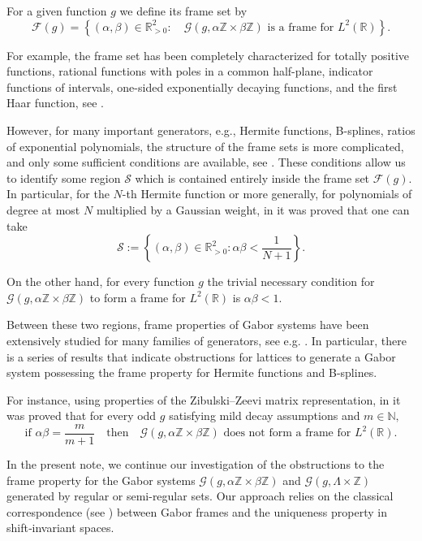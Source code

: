 \documentclass[12pt]{amsart}
\numberwithin{equation}{section}
\newcommand{\R}{{\mathbb R}} \newcommand{\Q}{{\mathbb Q}} \newcommand{\Z}{{\mathbb Z}} \newcommand{\N}{{\mathbb N}}
\begin{document}
For a given function $g$ we define its frame set by $$\mathcal{F}(g) = \left\{(\alpha,\beta) \in \R^2_{>0} : \quad \mathcal{G}(g, \alpha \Z \times \beta \Z) \text{ is a frame for }L^2(\R)\right\}. $$

For example, the frame set has been completely characterized for totally positive functions, rational functions with poles in a common half-plane, indicator functions of intervals, one-sided exponentially decaying functions, and the first Haar function, see \cite{BELOV2026101892,MR4542702, MR3545108,  MR4722277, MR3763405, MR3053565, MR1955931}.


However, for many important generators, e.g., Hermite functions, B-splines, ratios of exponential polynomials, the  structure of the frame sets is more complicated, and only some sufficient conditions are available, see \cite{MR2529475, MR4832036, MR4865221}. These conditions allow us to identify some region $\mathcal{S}$ which is contained entirely inside the frame set $\mathcal{F}(g).$
In particular, for the $N$-th Hermite function or more generally, for polynomials of degree at most $N$ multiplied by a Gaussian weight, in \cite{MR2529475} it was proved that one can take 
$$
\mathcal{S}:= \left\{(\alpha,\beta)\in\R^2_{>0} : \alpha\beta < \frac{1}{N+1}\right\}.
$$



On the other hand, for every function $g$ the trivial necessary condition for $\mathcal{G}(g, \alpha\Z \times \beta \Z)$ to form a frame for $L^2(\R)$ is $\alpha \beta <1.$

Between these two regions, frame properties of  Gabor systems have been extensively studied for many families of generators, see e.g. \cite{ MR4887696, MR4793698, MR4849800, MR3027914}.
In particular, there is a series of results that indicate obstructions for lattices to generate a Gabor system possessing the frame property for Hermite functions and B-splines. 

For instance, using properties of the Zibulski--Zeevi matrix representation, in  \cite{MR3027914} it was proved that for every odd $g$ satisfying mild decay assumptions and $m \in \N,$ 
\begin{equation}
    \text{if } \alpha\beta = \frac{m}{m+1} \quad \text{then} \quad \mathcal{G}(g, \alpha \Z \times \beta \Z)\,\, \text{does not form a frame for} \,\, L^2(\R).
\end{equation}


In the present note, we continue our investigation of the obstructions to the frame property for the Gabor systems $\mathcal{G}(g, \alpha \Z \times \beta \Z)$ 
and $\mathcal{G}(g, \Lambda \times \Z)$ generated by regular or semi-regular sets. Our approach relies on the classical correspondence (see \cite{jan95}) between Gabor frames and the uniqueness property in shift‑invariant spaces.
\end{document}
